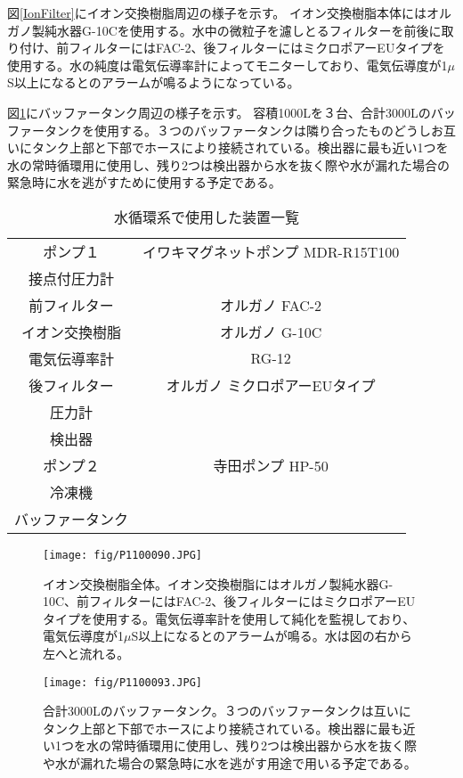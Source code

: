 \documentclass[11pt]{ltjsreport}
\newcommand{\figref}[1]{図\ref{#1}}
\begin{document}
\figref{IonFilter}にイオン交換樹脂周辺の様子を示す。
イオン交換樹脂本体にはオルガノ製純水器G-10Cを使用する。水中の微粒子を濾しとるフィルターを前後に取り付け、前フィルターにはFAC-2、後フィルターにはミクロポアーEUタイプを使用する。水の純度は電気伝導率計によってモニターしており、電気伝導度が1$\mu$S以上になるとのアラームが鳴るようになっている。

\figref{BufferTank}にバッファータンク周辺の様子を示す。
容積1000Lを３台、合計3000Lのバッファータンクを使用する。３つのバッファータンクは隣り合ったものどうしお互いにタンク上部と下部でホースにより接続されている。検出器に最も近い1つを水の常時循環用に使用し、残り2つは検出器から水を抜く際や水が漏れた場合の緊急時に水を逃がすために使用する予定である。

\begin{table}[htdp]
\caption[水循環系で使用した装置一覧]{水循環系で使用した装置一覧}
\begin{center}
\begin{tabular}{cc}
\hline \hline
ポンプ１ & イワキマグネットポンプ MDR-R15T100\\
接点付圧力計 & \\
前フィルター & オルガノ FAC-2\\
イオン交換樹脂 & オルガノ G-10C\\
電気伝導率計 & RG-12\\
後フィルター & オルガノ ミクロポアーEUタイプ\\
圧力計 & \\
検出器 & \\
ポンプ２ & 寺田ポンプ HP-50\\
冷凍機 & \\
バッファータンク & \\
\hline \hline
\end{tabular}
\end{center}
\label{WaterEquip}
\end{table}%
\fi


\begin{figure}[htbp]
\begin{minipage}{0.47\textwidth}
\centering
\texttt{[image: fig/P1100090.JPG]}
\caption[イオン交換樹脂]{イオン交換樹脂全体。イオン交換樹脂にはオルガノ製純水器G-10C、前フィルターにはFAC-2、後フィルターにはミクロポアーEUタイプを使用する。電気伝導率計を使用して純化を監視しており、電気伝導度が1$\mu$S以上になるとのアラームが鳴る。水は図の右から左へと流れる。}
\label{IonFilter}
\end{minipage}
\hfil
\begin{minipage}{0.47\textwidth}
\centering
\texttt{[image: fig/P1100093.JPG]}
\caption[バッファータンク]{合計3000Lのバッファータンク。３つのバッファータンクは互いにタンク上部と下部でホースにより接続されている。検出器に最も近い1つを水の常時循環用に使用し、残り2つは検出器から水を抜く際や水が漏れた場合の緊急時に水を逃がす用途で用いる予定である。}
\label{BufferTank}
\end{minipage}
\end{figure}
\end{document}
